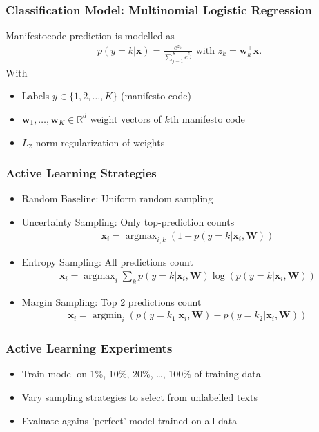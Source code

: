 \documentclass[]{beamer}
\newcommand{\R}{\ensuremath{\mathds{R}}}
\DeclareMathOperator*{\argmax}{argmax}
\DeclareMathOperator*{\argmin}{argmin}
\renewcommand{\vec}[1]{\mathbf{#1}}
\begin{document}
\begin{frame}\frametitle{Classification Model: Multinomial Logistic Regression}
Manifestocode prediction is modelled as
\begin{eqnarray}\label{eq:logreg_multiclass}
p(y=k|\vec{x}) = \frac{e^{z_k}}{\sum_{j=1}^K e^{z_j}}  \textrm{ with }  z_k=\vec{w}_k^{\top}\vec{x}.
\end{eqnarray}
With
\begin{itemize}
\item Labels $y\in\{1,2,\dots,K\}$ (manifesto code)\\ 
\item $\vec{w}_1,\dots,\vec{w}_K\in\R^{d}$ weight vectors of $k$th manifesto code\\ 
\item $L_2$ norm regularization of weights
\end{itemize}
\end{frame}

\begin{frame}\frametitle{Active Learning Strategies}

\begin{itemize}
\item Random Baseline: Uniform random sampling
\item Uncertainty Sampling: Only top-prediction counts
\begin{align}\label{eq:uncertainty_sampling}
\vec{x}_i = \argmax_{i,k} \left(1- p(y=k|\vec{x}_i,\vec{W})\right)
\end{align}
\item Entropy Sampling: All predictions count
\begin{align}\label{eq:entropy_sampling}
\vec{x}_i = \argmax_{i} \sum_k p(y=k|\vec{x}_i,\vec{W}) \log(p(y=k|\vec{x}_i,\vec{W}))
\end{align}
\item Margin Sampling: Top 2 predictions count
\begin{align}\label{eq:entropy_sampling}
\vec{x}_i = \argmin_{i} \left(p(y=k_1|\vec{x}_i,\vec{W}) - p(y=k_2|\vec{x}_i,\vec{W}) \right)
\end{align}
\end{itemize}
\end{frame}

\begin{frame}\frametitle{Active Learning Experiments}

\begin{itemize}
\item Train model on 1\%, 10\%, 20\%, \dots, 100\% of training data
\item Vary sampling strategies to select from unlabelled texts
\item Evaluate agains 'perfect' model trained on all data
\end{itemize}
\end{frame}
\end{document}
